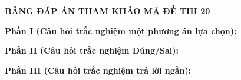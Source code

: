 	
	\newpage
	\begin{center} \textbf{BẢNG ĐÁP ÁN THAM KHẢO MÃ ĐỀ THI 20} \end{center}
	
	\noindent \textbf{Phần I (Câu hỏi trắc nghiệm một phương án lựa chọn):}  
	
	\noindent \textbf{Phần II (Câu hỏi trắc nghiệm Đúng/Sai):}
	
	\noindent \textbf{Phần III (Câu hỏi trắc nghiệm trả lời ngắn):}
	
	\label{B\thedeso}